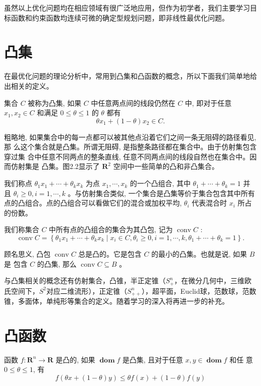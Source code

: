 虽然以上优化问题均在相应领域有很广泛地应用，但作为初学者，我们主要学习目标函数和约束函数均连续可微的确定型规划问题，即非线性最优化问题。

\section{凸集}
在最优化问题的理论分析中，常用到凸集和凸函数的概念，所以下面我们简单地给出相关的定义。

集合 $C$ 被称为凸集, 如果 $C$ 中任意两点间的线段仍然在 $C$ 中, 即对于任意 $x_{1}, x_{2} \in C$ 和满足 $0 \leqslant \theta \leqslant 1$ 的 $\theta$ 都有
$$
\theta x_{1}+(1-\theta) x_{2} \in C .
$$

粗略地, 如果集合中的每一点都可以被其他点沿着它们之间一条无阻碍的路径看见, 那 么这个集合就是凸集。所谓无阻碍, 是指整条路径都在集合中。由于仿射集包含穿过集 合中任意不同两点的整条直线, 任意不同两点间的线段自然也在集合中。因而仿射集是 凸集。图2.2显示了 $\mathbf{R}^{2}$ 空间中一些简单的凸和非凸集合。

我们称点 $\theta_{1} x_{1}+\cdots+\theta_{k} x_{k}$ 为点 $x_{1}, \cdots, x_{k}$ 的一个凸组合, 其中 $\theta_{1}+\cdots+\theta_{k}=1$ 并且 $\theta_{i} \geqslant 0, i=1, \cdots, k$ 。与仿射集合类似, 一个集合是凸集等价于集合包含其中所有点的凸组合。点的凸组合可以看做它们的混合或加权平均, $\theta_{i}$ 代表混合时 $x_{i}$ 所占的份数。

我们称集合 $C$ 中所有点的凸组合的集合为其凸包, 记为 $\operatorname{conv} C$ :
$$
\operatorname{conv} C=\left\{\theta_{1} x_{1}+\cdots+\theta_{k} x_{k} \mid x_{i} \in C, \theta_{i} \geqslant 0, i=1, \cdots, k, \theta_{1}+\cdots+\theta_{k}=1\right\} .
$$

顾名思义, 凸包 $\operatorname{conv} C$ 总是凸的。它是包含 $C$ 的最小的凸集。也就是说, 如果 $B$ 是 包含 $C$ 的凸集, 那么 $\operatorname{conv} C \subseteq B$ 。

与凸集相关的概念还有仿射集合，凸锥，半正定锥（$S^{n}_{+}$，在微分几何中，三维欧氏空间下，$S^{2}$对应二维流形），正定锥（$S^{n}_{++}$），超平面，Euclid球，范数球，范数锥，多面体，单纯形等集合的定义。随着学习的深入将再进一步的补充。

\section{凸函数}
函数 $f: \mathbf{R}^{n} \rightarrow \mathbf{R}$ 是凸的, 如果 $\operatorname{\textbf{dom}} f$ 是凸集, 且对于任意 $x, y \in \operatorname{\textbf{dom}} f$ 和任 意 $0 \leqslant \theta \leqslant 1$, 有
$$
f(\theta x+(1-\theta) y) \leqslant \theta f(x)+(1-\theta) f(y)
$$

